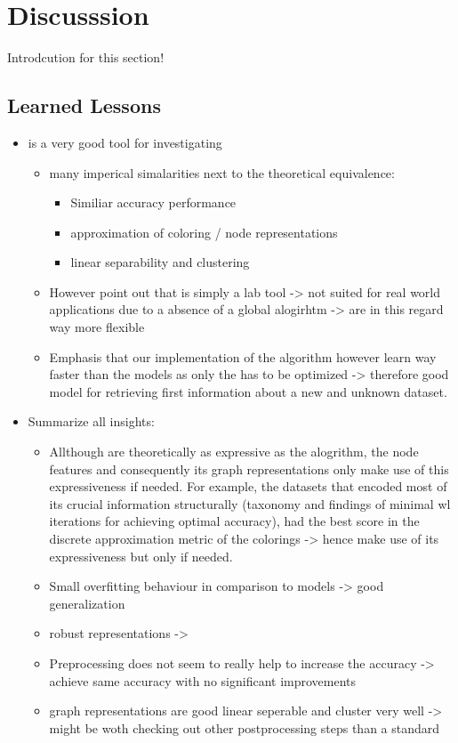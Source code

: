 \FloatBarrier
\section{Discusssion}\label{sec:discussion}
Introdcution for this section!

\subsection{Learned Lessons}
\begin{itemize}
	\item \wlnn is a very good tool for investigating \gnns
	\begin{itemize}
		\item many imperical simalarities next to the theoretical equivalence:
		\begin{itemize}
			\item Similiar accuracy performance
			\item approximation of coloring / node representations
			\item linear separability and clustering
		\end{itemize}
		\item However point out that \wlnn is simply a lab tool -> not suited for real world applications due to a absence of a global \wl alogirhtm  -> \gnns are in this regard way more flexible
		\item Emphasis that our implementation of the \wlnn algorithm however learn way faster than the \gnn models as only the \mlp has to be optimized -> therefore good model for retrieving first information about a new and unknown dataset.
	\end{itemize}
	\item Summarize all \gnn insights:
	\begin{itemize}
		\item Allthough \gnns are theoretically as expressive as the \wl alogrithm, the node features and consequently its graph representations only make use of this expressiveness if needed. For example, the \nci datasets that encoded most of its crucial information structurally (taxonomy and findings of minimal wl iterations for achieving optimal accuracy), had the best score in the discrete approximation metric of the \wl colorings -> hence \gnns make use of its expressiveness but only if needed.
		\item Small overfitting behaviour in comparison to \wlnn models -> good generalization
		\item robust representations -> 
		\item Preprocessing does not seem to really help to increase the accuracy -> achieve same accuracy with no significant improvements
		\item graph representations are good linear seperable and cluster very well -> might be woth checking out other postprocessing steps than a standard \mlp
	\end{itemize}
\end{itemize}

